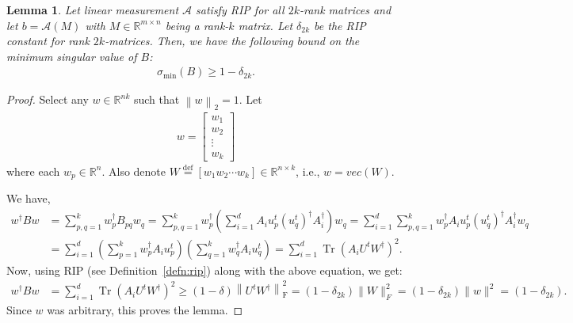 \documentclass[11pt]{article}
\theoremstyle{plain}
\newtheorem{lemma}[theorem]{Lemma}
\theoremstyle{definition}
\newcommand{\rn}{\mathbb{R}^n}
\newcommand{\rmn}{\mathbb{R}^{m \times n}}
\newcommand{\Tr}{\operatorname{Tr}}
\newcommand{\R}{\mathbb{R}}
\newcommand{\eqdef}{\stackrel{\textrm{def}}{=}}
\newcommand{\frob}[1]{\left\| {#1} \right\|_\text{F}}
\newcommand{\twonorm}[1]{\left\| {#1} \right\|_2}
\newcommand{\aff}{{\mathcal A}}
\begin{document}
\begin{lemma}\label{lemma:sensing-minsingval-B}
Let linear measurement $\aff$ satisfy RIP for all $2k$-rank matrices and let $b=\aff(M)$ with $M\in \rmn$ being a rank-$k$ matrix.  Let $\delta_{2k}$ be the RIP constant for rank $2k$-matrices. Then, we have the following bound on the minimum singular value of $B$:
\begin{align}\label{eqn:sensing-minsingval-B}
\sigma_{\textrm{min}}(B) \geq 1-\delta_{2k}.
\end{align}
\end{lemma}
\begin{proof}
  Select any $w\in \R^{nk}$ such that $\twonorm{w}=1$. Let
\begin{align*}
w = \left[ \begin{array}{c}
            w_1 \\
	    w_2 \\
	    \vdots \\
	    w_k
           \end{array}
    \right]
\end{align*}
where each $w_p\in \rn$. Also denote $W \eqdef \left[w_1 w_2 \cdots w_k\right] \in \R^{n\times k}$, i.e., $w=vec(W)$. 

We have,
\begin{align*}
  w^\dag  B w &= \sum_{p,q=1}^k w_p^\dag  B_{pq} w_q
	= \sum_{p,q=1}^k w_p^\dag  \left(\sum_{i=1}^d A_i u_p^t (u_q^t)^\dag  A_i^\dag  \right)w_q 
	= \sum_{i=1}^d \sum_{p,q=1}^k w_p^\dag  A_i u_p^t (u_q^t)^\dag  A_i^\dag  w_q \\
	&= \sum_{i=1}^d \left(\sum_{p=1}^k w_p^\dag  A_i u_p^t\right) \left(\sum_{q=1}^k w_q^\dag  A_i u_q^t\right)=\sum_{i=1}^d \Tr\left(A_iU^tW^\dag \right)^2.
\end{align*}
Now, using RIP (see Definition~\ref{defn:rip}) along with the above equation, we get:
\begin{align*}
	w^\dag  B w&=\sum_{i=1}^d \Tr\left(A_iU^tW^\dag \right)^2\geq \left(1-\delta\right) \frob{U^tW^\dag }^2=\left(1-\delta_{2k}\right) \|W\|_F^2=(1-\delta_{2k})\|w\|^2=(1-\delta_{2k}). 
\end{align*}
Since $w$ was arbitrary, this proves the lemma.
\end{proof}

\end{document}
